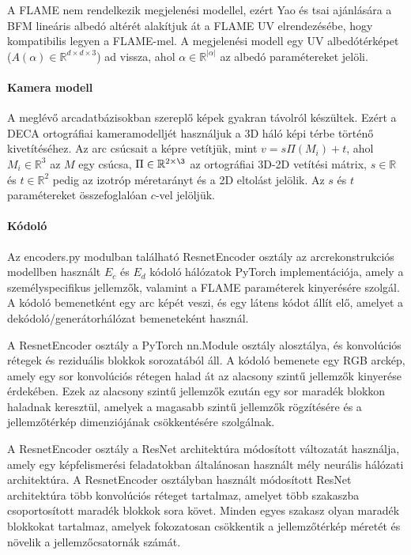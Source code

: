 \documentclass[12pt,a4]{article}
\begin{document}
        A FLAME nem rendelkezik megjelenési modellel, ezért \cite{deca} Yao és tsai ajánlására a BFM lineáris albedó altérét alakítjuk át
        a FLAME UV elrendezésébe, hogy kompatibilis legyen a FLAME-mel. A megjelenési modell egy UV albedótérképet ($A(\alpha) \in \mathbb{R}^{d \times d \times 3}$) ad vissza, ahol $\alpha \in \mathbb{R}^{|\alpha|}$ az albedó paramétereket jelöli.  
         
         \paragraph{Kamera modell}

          A meglévő arcadatbázisokban szereplő képek gyakran távolról készültek.
          Ezért a DECA ortográfiai kameramodelljét használjuk a 3D háló képi térbe történő kivetítéséhez.
          Az arc csúcsait a képre vetítjük, mint $v = s\Pi(M_{i}) + t$, ahol
          $M_{i} \in \mathbb{R}^{3}$ az $M$ egy csúcsa, $\Pi \in \mathbb{R}^{2 \times \3}$ az ortográfiai 3D-2D vetítési mátrix, $s \in \mathbb{R}$ és $t \in \mathbb{R}^{2}$ pedig az izotróp méretarányt és a 2D eltolást jelölik. Az $s$ és $t$ paramétereket összefoglalóan $c$-vel jelöljük.
                     
         \paragraph{Kódoló}

            Az encoders.py modulban található ResnetEncoder osztály az arcrekonstrukciós modellben használt $E_c$ és $E_d$ kódoló  hálózatok PyTorch implementációja, amely a személyspecifikus jellemzők, valamint a FLAME paraméterek kinyerésére szolgál. 
            A kódoló bemenetként egy arc képét veszi, és egy látens kódot állít elő, amelyet a dekódoló/generátorhálózat bemeneteként használ.
            
            A ResnetEncoder osztály a PyTorch nn.Module osztály alosztálya, és konvolúciós rétegek és reziduális blokkok sorozatából áll.
            A kódoló bemenete egy RGB arckép, amely egy sor konvolúciós rétegen halad át az alacsony szintű jellemzők kinyerése érdekében.
            Ezek az alacsony szintű jellemzők ezután egy sor maradék blokkon haladnak keresztül, amelyek a magasabb szintű jellemzők rögzítésére és a jellemzőtérkép dimenziójának csökkentésére szolgálnak.
            
            A ResnetEncoder osztály a ResNet architektúra módosított változatát használja, amely egy képfelismerési feladatokban általánosan használt mély neurális hálózati architektúra.
            A ResnetEncoder osztályban használt módosított ResNet architektúra több konvolúciós réteget tartalmaz, amelyet több szakaszba csoportosított maradék blokkok sora követ.
            Minden egyes szakasz olyan maradék blokkokat tartalmaz, amelyek fokozatosan csökkentik a jellemzőtérkép méretét és növelik a jellemzőcsatornák számát.
            
\end{document}
